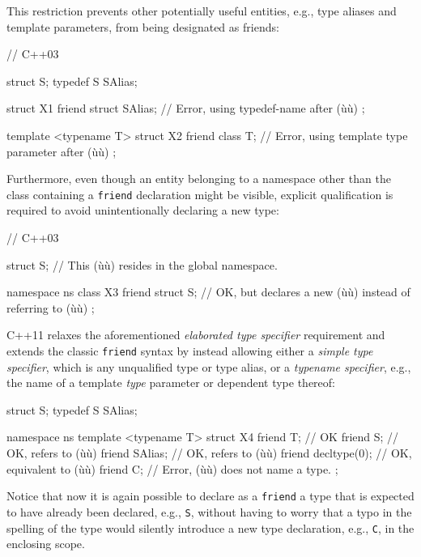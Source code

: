 \noindent This restriction prevents other potentially useful entities, e.g., type
aliases and template parameters, from being designated as friends:

\begin{emcppslisting}
// C++03

struct S;
typedef S SAlias;

struct X1
{
    friend struct SAlias;  // Error, using typedef-name after (ù{}ù)
};

template <typename T>
struct X2
{
    friend class T;        // Error, using template type parameter after (ù{}ù)
};
\end{emcppslisting}

\noindent Furthermore, even though an entity belonging to a namespace other than
the class containing a \lstinline!friend! declaration might be visible,
explicit qualification is required to avoid unintentionally declaring a new type:

\begin{emcppslisting}
// C++03

struct S;  // This (ù{}ù) resides in the global namespace.

namespace ns
{
    class X3
    {
        friend struct S;
            // OK, but declares a new (ù{}ù) instead of referring to (ù{}ù)
    };
}
\end{emcppslisting}

\noindent C++11 relaxes the aforementioned \emph{elaborated type specifier}
requirement and extends the classic \lstinline!friend! syntax by instead
allowing either a \emph{simple type specifier}, which is any unqualified
type or type alias, or a \emph{typename specifier}, e.g., the name of a
template \emph{type} parameter or dependent type thereof:

\begin{emcppslisting}
struct S;
typedef S SAlias;

namespace ns
{
    template <typename T>
    struct X4
    {
        friend T;           // OK
        friend S;           // OK, refers to (ù{}ù)
        friend SAlias;      // OK, refers to (ù{}ù)
        friend decltype(0); // OK, equivalent to (ù{}ù)
        friend C;           // Error, (ù{}ù) does not name a type.
    };
}
\end{emcppslisting}

\noindent Notice that now it is again possible to declare as a \lstinline!friend! a
type that is expected to have already been declared, e.g., \lstinline!S!,
without having to worry that a typo in the spelling of the type would
silently introduce a new type declaration, e.g., \lstinline!C!, in the
enclosing scope.

